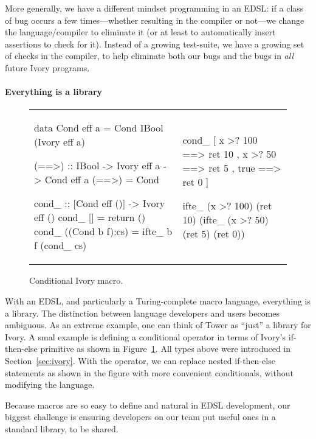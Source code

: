 More generally, we have a different mindset programming in an EDSL: if a class
of bug occurs a few times---whether resulting in the compiler or not---we change
the language/compiler to eliminate it (or at least to automatically insert
assertions to check for it).  Instead of a growing test-suite, we
have a growing set of checks in the compiler, to help eliminate both our bugs
and the bugs in \emph{all} future Ivory programs.

\paragraph{Everything is a library}

\begin{figure}
  \begin{tabular}{p{}|p{}}
    \begin{smcode}
data Cond eff a =
  Cond IBool (Ivory eff a)

(==>) :: IBool -> Ivory eff a
      -> Cond eff a
(==>) = Cond

cond_ :: [Cond eff ()]
      -> Ivory eff ()
cond_ [] = return ()
cond_ ((Cond b f):cs) =
  ifte_ b f (cond_ cs)
    \end{smcode} &
    \begin{smcode}
cond_
  [ x >? 100 ==> ret 10
  , x >? 50  ==> ret 5
  , true     ==> ret 0 ]

ifte_ (x >? 100)
 (ret 10)
 (ifte_ (x >? 50)
   (ret 5)
     (ret 0))
    \end{smcode}
  \end{tabular}
  \caption{Conditional Ivory macro.}
  \label{fig:ivory-cond}
\end{figure}

With an EDSL, and particularly a Turing-complete macro language, everything is a
library.  The distinction between language developers and users becomes
ambiguous.  As an extreme example, one can think of Tower as ``just'' a library
for Ivory.  A smal example is defining a conditional operator in terms of
Ivory's if-then-else primitive as shown in Figure~\ref{fig:ivory-cond}.  All
types above were introduced in Section~\ref{sec:ivory}.  With the 
operator, we can replace nested if-then-else statements as shown in the figure
with more convenient conditionals, without modifying the language.

Because macros are so easy to define and natural in EDSL development, our
biggest challenge is ensuring developers on our team put useful ones in a
standard library, to be shared.

